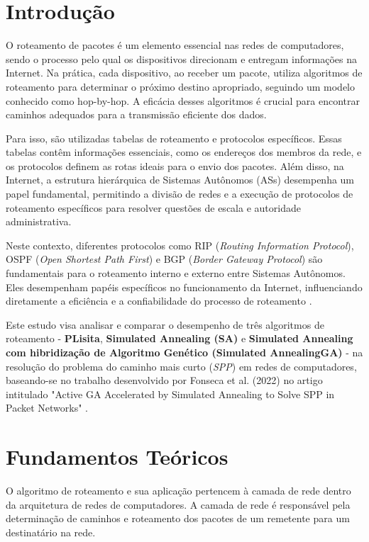 \documentclass[conference]{IEEEtran}
\begin{document}

\section{Introdução}
O roteamento de pacotes é um elemento essencial nas redes de computadores, sendo o processo pelo qual os dispositivos direcionam e entregam informações na Internet. Na prática, cada dispositivo, ao receber um pacote, utiliza algoritmos de roteamento para determinar o próximo destino apropriado, seguindo um modelo conhecido como hop-by-hop. A eficácia desses algoritmos é crucial para encontrar caminhos adequados para a transmissão eficiente dos dados.

Para isso, são utilizadas tabelas de roteamento e protocolos específicos. Essas tabelas contêm informações essenciais, como os endereços dos membros da rede, e os protocolos definem as rotas ideais para o envio dos pacotes. Além disso, na Internet, a estrutura hierárquica de Sistemas Autônomos (ASs) desempenha um papel fundamental, permitindo a divisão de redes e a execução de protocolos de roteamento específicos para resolver questões de escala e autoridade administrativa.

Neste contexto, diferentes protocolos como RIP (\textit{Routing Information Protocol}), OSPF (\textit{Open Shortest Path First}) e BGP (\textit{Border Gateway Protocol}) são fundamentais para o roteamento interno e externo entre Sistemas Autônomos. Eles desempenham papéis específicos no funcionamento da Internet, influenciando diretamente a eficiência e a confiabilidade do processo de roteamento \cite{KuroseRoss2010}.

Este estudo visa analisar e comparar o desempenho de três algoritmos de roteamento - \textbf{PLisita}, \textbf{Simulated Annealing (SA)} e \textbf{Simulated Annealing com hibridização de Algoritmo Genético (Simulated AnnealingGA)} - na resolução do problema do caminho mais curto (\textit{SPP}) em redes de computadores, baseando-se no trabalho desenvolvido por Fonseca et al. (2022) no artigo intitulado "Active GA Accelerated by Simulated Annealing to Solve SPP in Packet Networks" \cite{OL2ARouter}.

\section{Fundamentos Teóricos}

O algoritmo de roteamento e sua aplicação pertencem à camada de rede dentro da arquitetura de redes de computadores. A camada de rede é responsável pela determinação de caminhos e roteamento dos pacotes de um remetente para um destinatário na rede.
\end{document}

